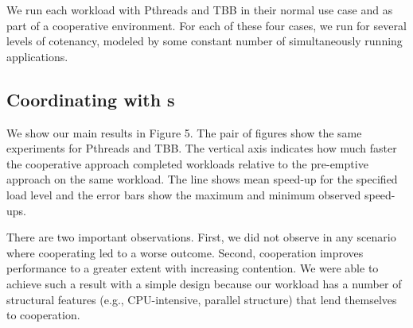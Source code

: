 We run each workload with Pthreads and TBB in their normal use case and as part of a cooperative environment. For each of these four cases, we run for several levels of cotenancy, modeled by some constant number of simultaneously running applications.

\subsection{Coordinating with \mech{}s}

We show our main results in Figure 5. The pair of figures show the same experiments for Pthreads and TBB. The vertical axis indicates how much faster the cooperative approach completed workloads relative to the pre-emptive approach on the same workload. The line shows mean speed-up for the specified load level and the error bars show the maximum and minimum observed speed-ups.

There are two important observations. First, we did not observe in any scenario where cooperating led to a worse outcome. Second, cooperation improves performance to a greater extent with increasing contention. We were able to achieve such a result with a simple design because our workload has a number of structural features (e.g., CPU-intensive, parallel structure) that lend themselves to cooperation.





